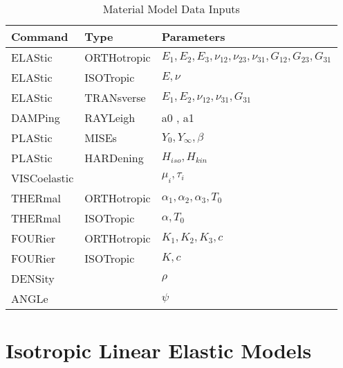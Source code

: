 \begin{table}[ht!]
\begin{center}
\begin{tabular}{| l | l | l |} \hline
Command & Type & Parameters \\ \hline
ELAStic & ORTHotropic & $E_1, E_2, E_3, \nu_{12},
\nu_{23}, \nu_{31}, G_{12}, G_{23}, G_{31}$ \\
ELAStic & ISOTropic & $E, \nu$ \\
ELAStic & TRANsverse & $E_1, E_2, \nu_{12}, \nu_{31}, G_{31}$ \\
DAMPing & RAYLeigh  & a0 , a1 \\
PLAStic & MISEs       & $Y_0, Y_{\infty}, \beta$ \\
PLAStic & HARDening   & $H_{iso}, H_{kin}$ \\
VISCoelastic & & $\mu_i, \tau_i$ \\
THERmal & ORTHotropic & $\alpha_1, \alpha_2, \alpha_3, T_0$ \\
THERmal & ISOTropic   & $\alpha, T_0$ \\ \hline
FOURier & ORTHotropic & $K_1, K_2, K_3, c$ \\
FOURier & ISOTropic   & $K, c$ \\ \hline
DENSity &       & $\rho$ \\ \hline
ANGLe   &       & $\psi$ \\ \hline
\end{tabular}
\end{center}
\caption{Material Model Data Inputs}
\label{tab131a}
\end{table}

\section{Isotropic Linear Elastic Models}
\label{isosel}


